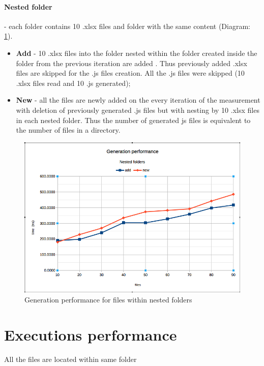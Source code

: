 \paragraph{Nested folder} - each folder contains 10 .xlsx files and folder with the same content (Diagram: \ref{fig:gn}).
\begin{itemize}
	\item \textbf{Add} - 10 .xlsx files into the folder nested within the folder created inside the folder from the previous iteration are added . Thus previously added .xlsx files are skipped for  the .js files creation. All the .js files were skipped (10 .xlsx files read and 10 .js generated);
	\item \textbf{New} - all the files are newly added on the every iteration of the measurement with deletion of previously generated .js files but with nesting by 10 .xlsx files in each nested folder. Thus the number of generated js files is equivalent to the number of files in a directory.
\end{itemize}


\begin{figure}[ht]
	\label{fig:gn}
	\centering
	\includegraphics[width=\textwidth]{grafiken/generation_nested}
	\caption{Generation performance for files within nested folders}
\end{figure}

\section{Executions performance}
All the files are located within same folder 
